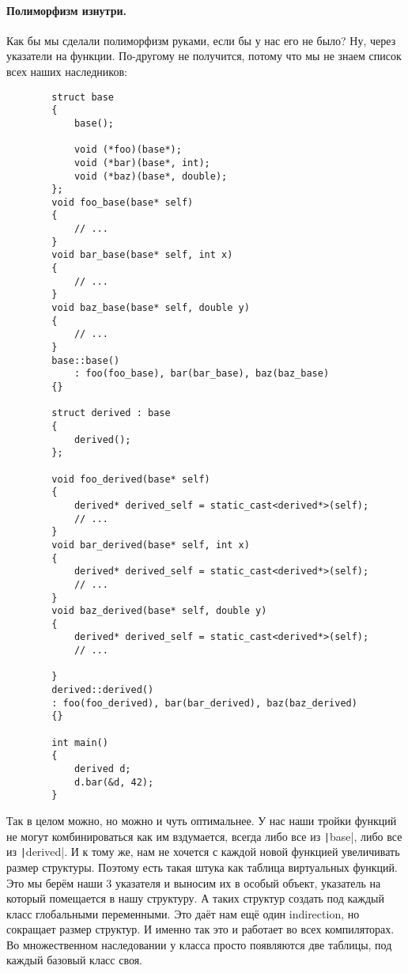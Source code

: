 \documentclass{article}
\begin{document}
    \paragraph{Полиморфизм изнутри.}
    Как бы мы сделали полиморфизм руками, если бы у нас его не было? Ну, через указатели на функции. По-другому не получится, потому что мы не знаем список всех наших наследников:
    \begin{verbatim}
        struct base
        {
            base();
            
            void (*foo)(base*);
            void (*bar)(base*, int);
            void (*baz)(base*, double);
        };
        void foo_base(base* self)
        {
            // ...
        }
        void bar_base(base* self, int x)
        {
            // ...
        }
        void baz_base(base* self, double y)
        {
            // ...
        }
        base::base()
            : foo(foo_base), bar(bar_base), baz(baz_base)
        {}

        struct derived : base
        {
            derived();
        };
        
        void foo_derived(base* self)
        {
            derived* derived_self = static_cast<derived*>(self);
            // ...
        }
        void bar_derived(base* self, int x)
        {
            derived* derived_self = static_cast<derived*>(self);
            // ...
        }
        void baz_derived(base* self, double y)
        {
            derived* derived_self = static_cast<derived*>(self);
            // ...
            
        }
        derived::derived()
        : foo(foo_derived), bar(bar_derived), baz(baz_derived)
        {}

        int main()
        {
            derived d;
            d.bar(&d, 42);
        }
    \end{verbatim}
    Так в целом можно, но можно и чуть оптимальнее. У нас наши тройки функций не могут комбинироваться как им вздумается, всегда либо все из \texttt|base|, либо все из \texttt|derived|. И к тому же, нам не хочется с каждой новой функцией увеличивать размер структуры. Поэтому есть такая штука как таблица виртуальных функций. Это мы берём наши 3 указателя и выносим их в особый объект, указатель на который помещается в нашу структуру. А таких структур создать под каждый класс глобальными переменными. Это даёт нам ещё один indirection, но сокращает размер структур. И именно так это и работает во всех компиляторах. Во множественном наследовании у класса просто появляются две таблицы, под каждый базовый класс своя.
\end{document}
